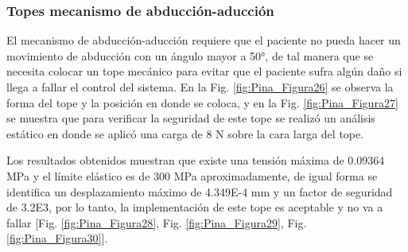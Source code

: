 \subsubsection*{ Topes mecanismo de abducción-aducción}
El mecanismo de abducción-aducción requiere que el paciente no pueda hacer un movimiento de abducción con un ángulo mayor a 50°, de tal manera que se necesita colocar un tope mecánico para evitar que el paciente sufra algún daño si llega a fallar el control del sistema. En la Fig. \ref{fig:Pina_Figura26} se observa la forma del tope y la posición en donde se coloca, y en la Fig. \ref{fig:Pina_Figura27} se muestra que para verificar la seguridad de este tope se realizó un análisis estático en donde se aplicó una carga de 8 N sobre la cara larga del tope.

Los resultados obtenidos muestran que existe una tensión máxima de 0.09364 MPa y el límite elástico es de 300 MPa aproximadamente, de igual forma se identifica un desplazamiento máximo de 4.349E-4 mm y un factor de seguridad de 3.2E3, por lo tanto, la implementación de este tope es aceptable y no va a fallar [Fig. \ref{fig:Pina_Figura28}, Fig. \ref{fig:Pina_Figura29}, Fig. \ref{fig:Pina_Figura30}].

